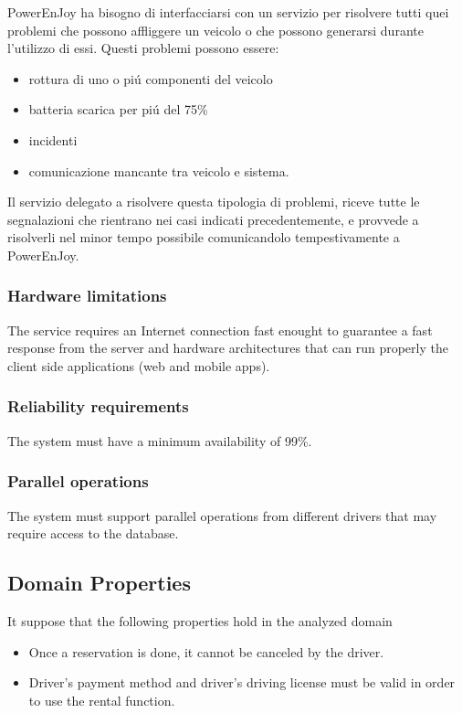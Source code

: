 PowerEnJoy ha bisogno di interfacciarsi con un servizio per risolvere tutti quei problemi che possono affliggere un veicolo o che possono generarsi durante l'utilizzo di essi.
Questi problemi possono essere:
\begin{itemize}
	\item rottura di uno o piú componenti del veicolo
	\item batteria scarica per piú del 75\%
	\item incidenti
	\item comunicazione mancante tra veicolo e sistema.
\end{itemize}
Il servizio delegato a risolvere questa tipologia di problemi, riceve tutte le segnalazioni che rientrano nei casi indicati precedentemente, e provvede a risolverli nel minor tempo possibile comunicandolo tempestivamente a PowerEnJoy.

\subsubsection{Hardware limitations}
The service requires an Internet connection fast enought to guarantee a fast response from the server and hardware architectures that can run properly the client side applications (web and mobile apps).

\subsubsection{Reliability requirements}
The system must have a minimum availability of 99\%.

\subsubsection{Parallel operations}
The system must support parallel operations from different drivers that may require access to the database.

\subsection{Domain Properties}

It suppose that the following properties hold in the analyzed domain
\begin{itemize}
	\item Once a reservation is done, it cannot be canceled by the driver.
	\item Driver's payment method and driver's driving license must be valid in order to use the rental function.
\end{itemize}

